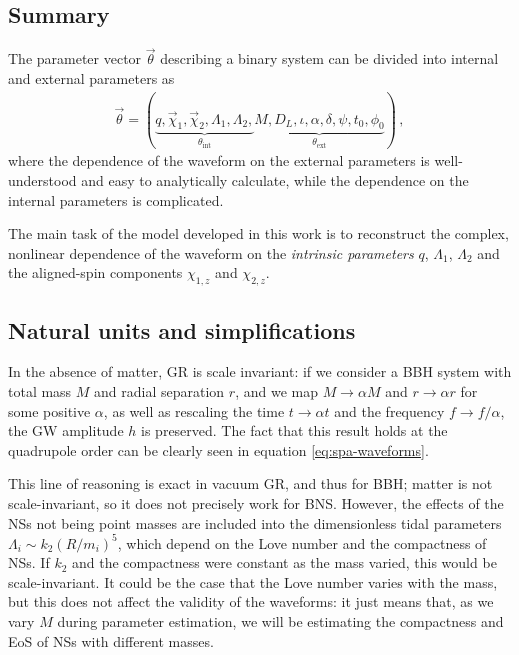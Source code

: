 \documentclass[main.tex]{subfiles}
\begin{document}
\subsection{Summary}

The parameter vector \(\vec{\theta}\) describing a binary system can be divided into internal and external parameters as 
%
\begin{align} \label{eq:parameter-decomposition}
\vec{\theta} = (\underbrace{q, \vec{\chi}_1, \vec{\chi}_2, \Lambda_1, \Lambda_2,}_{\theta _{\text{int}}} \underbrace{M, D_L, \iota, \alpha, \delta, \psi, t_0, \phi_0 }_{\theta _{\text{ext}}})
\,,
\end{align}
%
where the dependence of the waveform on the external parameters is well-understood and easy to analytically calculate, while the dependence on the internal parameters is complicated.

The main task of the model developed in this work is to reconstruct the complex, nonlinear dependence of the waveform on the \emph{intrinsic parameters} \(q\), \(\Lambda_1\), \(\Lambda_2 \) and the aligned-spin components \(\chi_{1,z} \) and \(\chi_{2, z}\).

\subsection{Natural units and simplifications} \label{sec:natural-units}

In the absence of matter, \ac{GR} is scale invariant: if we consider a \ac{BBH} system with total mass \(M\) and radial separation \(r\),
and we map \(M \to \alpha M\) and \(r \to \alpha r\) for some positive \(\alpha \), as well as rescaling the time \(t \to \alpha t \) and the frequency \(f \to f / \alpha \), the \ac{GW} amplitude \(h\) is preserved. 
The fact that this result holds at the quadrupole order can be clearly seen in equation \ref{eq:spa-waveforms}.

This line of reasoning is exact in vacuum GR, and thus for \ac{BBH}; matter is not scale-invariant, so it does not precisely work for \ac{BNS}. 
However, the effects of the \acp{NS} not being point masses are included into the dimensionless tidal parameters \(\Lambda_i \sim k_2 (R/m_i)^{5}\), which depend on the Love number and the compactness of \acp{NS}. If \(k_2 \) and the compactness were constant as the mass varied, this would be scale-invariant. 
It could be the case that the Love number varies with the mass, but this does not affect the validity of the waveforms: it just means that, as we vary \(M\) during parameter estimation, we will be estimating the compactness and \ac{EoS} of \acp{NS} with different masses. 
\end{document}
